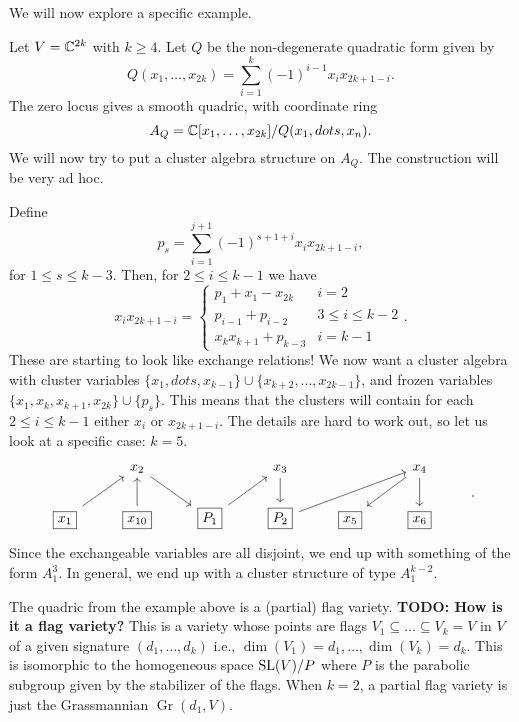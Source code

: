 \documentclass{article}
\DeclareMathOperator{\Gr}{Gr}
\begin{document}
We will now explore a specific example.
\begin{example}
	Let $V = \mathbb{C}^{2k}$ with $k\geq 4$. Let $Q$ be the non-degenerate quadratic form given by
	\begin{equation*}
		Q(x_1, \dots, x_{2k}) = \sum_{i=1}^k (-1)^{i-1}x_i x_{2k+1-i}.
	\end{equation*}
	The zero locus gives a smooth quadric, with coordinate ring
	\begin{equation*}
		A_Q = \mathbb{C}[x_1 , \dots, x_{2k}]/Q(x_1, dots, x_n).
	\end{equation*}
	We will now try to put a cluster algebra structure on $A_Q$.
	The construction will be very ad hoc.

	Define
	\begin{equation*}
		p_s = \sum_{i=1}^{j+1}(-1)^{s+1+i}x_i x_{2k+1-i},
	\end{equation*}
	for $1\leq s \leq k-3$. Then, for $2 \leq i \leq k -1$ we have
	\begin{equation*}
		x_i x_{2k+1 - i} =
		\begin{cases}
			p_1 + x_1 - x_{2k}    & i = 2              \\
			p_{i-1} + p_{i-2}     & 3 \leq i \leq k -2 \\
			x_k x_{k+1} + p_{k-3} & i = k - 1
		\end{cases}.
	\end{equation*}
	These are starting to look like exchange relations! We now want
	a cluster algebra with cluster variables $\{x_1 , dots, x_{k-1}\} \cup \{x_{k+2}, \dots, x_{2k-1}\}$, and
	frozen variables $\{x_1, x_{k},x_{k+1}, x_{2k}\} \cup \{p_s\}$. This means that the clusters will contain
	for each $2\leq i \leq k -1$ either $x_i$ or $x_{2k+1-i}$. The details are hard to work out,
	so let us look at a specific case: $k = 5$.
	\begin{equation*}
		\begin{tikzcd}
			& x_2 \ar[rd] & & x_3 \ar[d] & & x_4 \ar[ld] \ar[d] &\\
			\boxed{x_1} \ar[ru] & \boxed{x_{10}} \ar[u] & \boxed{P_1} \ar[ru] & \boxed{P_2} \ar[rru] & \boxed{x_5} & \boxed{x_6}
		\end{tikzcd}.
	\end{equation*}
	Since the exchangeable variables are all disjoint,
	we end up with something of the form $A_1^3$. In general, we end
	up with a cluster structure of type $A_1^{k - 2}$.
\end{example}

\begin{remark}
	The quadric from the example above is a (partial) flag variety.
	\textbf{TODO: How is it a flag variety?}
	This is
	a variety whose points are flags $V_1 \subseteq \dots \subseteq V_k = V$ in $V$
	of a given signature $(d_1, \dots, d_k)$ i.e., $\dim(V_1) = d_1, \dots, \dim(V_k) = d_k$.
	This is isomorphic to the homogeneous space $\operatorname{SL}(V)/P$ where $P$ is the parabolic
	subgroup given by the stabilizer of the flags. When $k=2$, a partial flag variety
	is just the Grassmannian $\Gr(d_1, V)$.
\end{remark}
\end{document}
